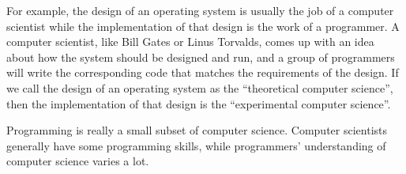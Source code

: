 \documentclass[../main.tex]{subfiles}
\begin{document}
    For example, the design of an operating system is usually the job of a computer
    scientist while the implementation of that design is the work of a programmer.
    A computer scientist, like Bill Gates or Linus Torvalds, comes up with an idea
    about how the system should be designed and run, and a group of programmers will
    write the corresponding code that matches the requirements of the design. If we
    call the design of an operating system as the ``theoretical computer science'',
    then the implementation of that design is the ``experimental computer science''.

    Programming is really a small subset of computer science. Computer scientists
    generally have some programming skills, while programmers' understanding of
    computer science varies a lot.
\end{document}
